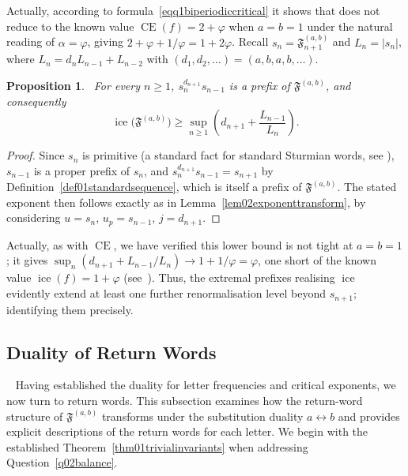 \documentclass[12pt]{amsart}
\theoremstyle{plain}
\newtheorem{proposition}[theorem]{Proposition}
\theoremstyle{definition}
\theoremstyle{remark}
\newcommand{\fphi}{\varphi}
\newcommand{\CE}{\operatorname{CE}}
\newcommand{\ice}{\operatorname{ice}}
\newcommand{\FD}{\mathfrak{F}}
\begin{document}
Actually, according to formula~\eqref{eqq1biperiodiccritical} it shows that does not reduce to the known
value $\CE(f)=2+\fphi$ when $a=b=1$
under the natural reading of $\alpha=\fphi$, giving $2+\fphi+1/\fphi=1+2\fphi$. 
Recall $s_n=\FD^{(a,b)}_{n+1}$ and $L_n=|s_n|$, where 
$L_n = d_n L_{n-1}+L_{n-2}$ with $(d_1,d_2,\ldots)=(a,b,a,b,\ldots)$.

\begin{proposition}~\label{prop01icelowerbound}
For every $n\geqslant 1$, $s_n^{d_{n+1}}s_{n-1}$ is a prefix of $\FD^{(a,b)}$, and consequently
\[
  \ice\bigl(\FD^{(a,b)}\bigr)\geqslant \sup_{n\geqslant 1}
  \left(d_{n+1}+\frac{L_{n-1}}{L_n}\right).
\]
\end{proposition}
\begin{proof}
Since $s_n$ is primitive (a standard fact for standard Sturmian words, see
\cite{Lothaire2002}), $s_{n-1}$ is a proper prefix of $s_n$, and
$s_n^{d_{n+1}}s_{n-1}=s_{n+1}$ by
Definition~\ref{def01standardsequence}, which is itself a prefix of
$\FD^{(a,b)}$. The stated exponent then follows exactly as in
Lemma~\ref{lem02exponenttransform}, by considering $u=s_n$, $u_p=s_{n-1}$,
$j=d_{n+1}$.
\end{proof}

Actually, as with $\CE$, we have verified this lower bound is not tight at
$a=b=1$; it gives $\sup_n(d_{n+1}+L_{n-1}/L_n) \to 1+1/\fphi=\fphi$, one short of the known value $\ice(f)=1+\fphi$ (see~\cite{Cassaigne2008}). Thus, the extremal prefixes realising
$\ice$ evidently extend at least one further renormalisation level
beyond $s_{n+1}$; identifying them precisely.

\medskip 

\subsection{Duality of Return Words}~\label{sec5duality}
Having established the duality for letter frequencies and critical exponents, we now turn to return words. This subsection examines how the return-word structure of $\FD^{(a,b)}$ transforms under the substitution duality $a\leftrightarrow b$ and provides explicit descriptions of the return words for each letter. 
We begin with the established Theorem~\ref{thm01trivialinvariants} when addressing Question~\ref{q02balance}.
\end{document}

